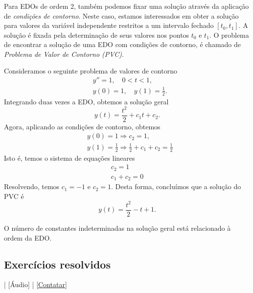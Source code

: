 Para EDOs de ordem 2, também podemos fixar uma solução através da aplicação de \emph{condições de contorno}. Neste caso, estamos interessados em obter a solução para valores da variável independente restritos a um intervalo fechado $[t_0, t_1]$. A solução é fixada pela determinação de seus valores nos pontos $t_0$ e $t_1$. O problema de encontrar a solução de uma EDO com condições de contorno, é chamado de \emph{Problema de Valor de Contorno (PVC)}.

\begin{ex}
  Consideramos o seguinte problema de valores de contorno
  \begin{align}
    &y'' = 1,\quad 0 < t < 1,\\
    &y(0) = 1,\quad y(1) = \frac{1}{2}.
  \end{align}
  Integrando duas vezes a EDO, obtemos a solução geral
  \begin{equation}
    y(t) = \frac{t^2}{2} + c_1t + c_2.
  \end{equation}
  Agora, aplicando as condições de contorno, obtemos
  \begin{align}
    &y(0) = 1 \Rightarrow c_2 = 1,\\
    &y(1) = \frac{1}{2} \Rightarrow \frac{1}{2} + c_1 + c_2 = \frac{1}{2}
  \end{align}
  Isto é, temos o sistema de equações lineares
  \begin{gather}
    c_2 = 1\\
    c_1 + c_2 = 0
  \end{gather}
  Resolvendo, temos $c_1=-1$ e $c_2=1$.  Desta forma, concluímos que a solução do PVC é
  \begin{equation}
    y(t) = \frac{t^2}{2} -t + 1.
  \end{equation}
\end{ex}

\begin{obs}
  O número de constantes indeterminadas na solução geral está relacionado à ordem da EDO.
\end{obs}

\subsection*{Exercícios resolvidos}

\begin{flushright}
  [Vídeo] | [Áudio] | \href{https://phkonzen.github.io/notas/contato.html}{[Contatar]}
\end{flushright}

